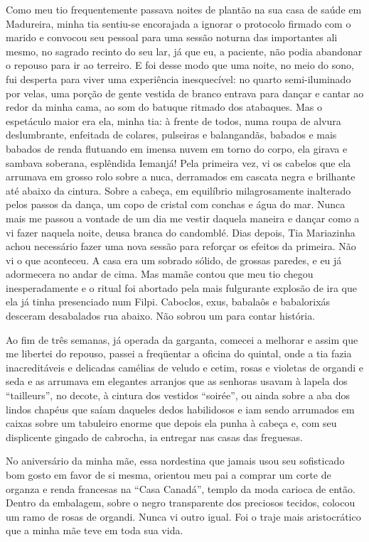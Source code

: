 Como meu tio frequentemente passava noites de plantão na sua casa de saúde em Madureira, minha tia sentiu-se encorajada a ignorar o protocolo firmado com o marido e convocou seu pessoal para uma sessão noturna das importantes ali mesmo, no sagrado recinto do seu lar, já que eu, a paciente, não podia abandonar o repouso para ir ao terreiro. 
E foi desse modo que uma noite, no meio do sono, fui desperta para viver uma experiência inesquecível: no quarto semi-iluminado por velas, uma porção de gente vestida de branco entrava para dançar e cantar ao redor da minha cama, ao som do batuque ritmado dos atabaques. 
Mas o espetáculo maior era ela, minha tia: à frente de todos, numa roupa de alvura deslumbrante, enfeitada de colares, pulseiras e balangandãs, babados e mais babados de renda flutuando em imensa nuvem em torno do corpo, ela girava e sambava soberana, esplêndida Iemanjá! 
Pela primeira vez, vi os cabelos que ela arrumava em grosso rolo sobre a nuca, derramados em cascata negra e brilhante até abaixo da cintura. 
Sobre a cabeça, em equilíbrio milagrosamente inalterado pelos passos da dança, um copo de cristal com conchas e água do mar.
 Nunca mais me passou a vontade de um dia me vestir daquela maneira e dançar como a vi fazer naquela noite, deusa branca do candomblé. 
Dias depois, Tia Mariazinha achou necessário fazer uma nova sessão para reforçar os efeitos da primeira. 
Não vi o que aconteceu. 
A casa era um sobrado sólido, de grossas paredes, e eu já adormecera no andar de cima. 
Mas mamãe contou que meu tio chegou inesperadamente e o ritual foi abortado pela mais fulgurante explosão de ira que ela já tinha presenciado num Filpi. 
Caboclos, exus, babalaôs e babalorixás desceram desabalados rua abaixo. Não sobrou um para contar história. 

Ao fim de três semanas, já operada da garganta, comecei a melhorar e assim que me libertei do repouso, passei a freqüentar a oficina do quintal, onde a tia fazia inacreditáveis e delicadas camélias de veludo e cetim, rosas e violetas de organdi e seda e as arrumava em elegantes arranjos que as senhoras usavam à lapela dos ``tailleurs'', no decote, à cintura dos vestidos ``soirée'', ou ainda sobre a aba dos lindos chapéus que saíam daqueles dedos habilidosos e iam sendo arrumados em caixas sobre um tabuleiro enorme que depois ela punha à cabeça e, com seu displicente gingado de cabrocha, ia entregar nas casas das freguesas.

No aniversário da minha mãe, essa nordestina que jamais usou seu sofisticado bom gosto em favor de si mesma, orientou meu pai a comprar um corte de organza e renda francesas na ``Casa Canadá'', templo da moda carioca de então. 
Dentro da embalagem, sobre o negro transparente dos preciosos tecidos, colocou um ramo de rosas de organdi. 
Nunca vi outro igual. 
Foi o traje mais aristocrático que a minha mãe teve em toda sua vida. 


